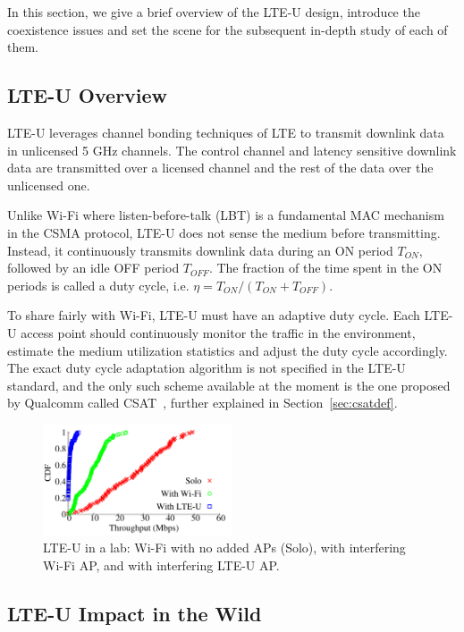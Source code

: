 
In this section, we give a brief overview of the LTE-U design, 
introduce the coexistence issues and set the scene for the subsequent in-depth study of each of them. 

\subsection{LTE-U Overview}

LTE-U leverages channel bonding techniques of LTE to transmit downlink data in unlicensed 5 GHz channels. The control channel and latency sensitive downlink data are transmitted over a licensed channel and the rest of the data over the unlicensed one. 

Unlike Wi-Fi where listen-before-talk (LBT) is a fundamental MAC mechanism in the CSMA protocol, LTE-U does not sense the medium before transmitting. Instead, it continuously transmits downlink data during an ON period $T_{ON}$, followed by an idle OFF period $T_{OFF}$. The fraction of the time spent in the ON periods is called a duty cycle, i.e. $\eta = T_{ON} / (T_{ON} + T_{OFF})$. 


To share fairly with Wi-Fi, LTE-U must have an adaptive duty cycle. 
Each LTE-U access point should continuously monitor the traffic in the environment, 
estimate the medium utilization statistics and 
adjust the duty cycle accordingly. The exact duty cycle adaptation algorithm is not specified in the LTE-U standard, and the only such scheme available at the moment is the one proposed by Qualcomm called CSAT~\cite{lteuforum_csat}, further explained in Section~\ref{sec:csatdef}.


\begin{figure}[!ht]
 \centering
    \includegraphics[width=0.5\textwidth]{./figures/motivation}
 \caption{LTE-U in a lab: Wi-Fi with no added APs (Solo), with interfering Wi-Fi AP, and with interfering LTE-U AP.}
  \label{fig:lteu_lab}
\end{figure}



\subsection{LTE-U Impact in the Wild}

